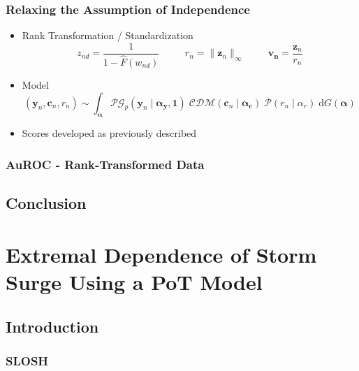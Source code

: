 \documentclass[aspectratio=169,10pt]{beamer}
\begin{document}
\begin{frame}
    \frametitle{Relaxing the Assumption of Independence}
    \begin{itemize}
        \item Rank Transformation / Standardization
        \[
            z_{nd} = \frac{1}{1 - \hat{F}(w_{nd})}\
            \hspace{1cm}r_n = \lVert \bm{z}_n\rVert_{\infty}
            \hspace{1cm}\bm{v_{n}} = \frac{\bm{z}_n}{r_n}
        \]
        \item Model
        \[
        (\bm{y}_n,\bm{c}_n,r_n) \sim \int_{\bm{\alpha}}
            \mathcal{PG}_p(\bm{y}_n\mid\bm{\alpha}_{\bm{y}}, \bm{1})\;
            \mathcal{CDM}(\bm{c}_n\mid\bm{\alpha}_{\bm{c}})\;
            \mathcal{P}(r_n\mid\alpha_r)\;
            \text{d}G(\bm{\alpha})
        \]
        \item Scores developed as previously described        
    \end{itemize}
\end{frame} %

\begin{frame}
    \frametitle{AuROC - Rank-Transformed Data}
    \begin{table}
        \centering
        
    \end{table}
\end{frame} %

\subsection{Conclusion}

\section[Application At Scale]{Extremal Dependence of Storm Surge Using a PoT Model}
\subsection{Introduction}

\subsubsection{SLOSH}
\end{document}
